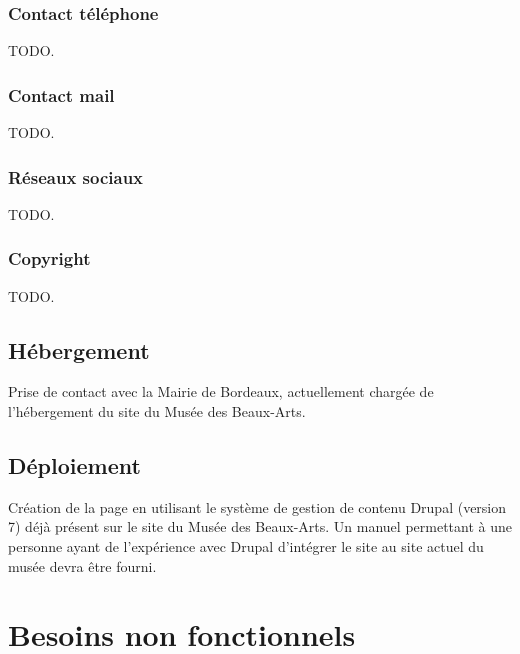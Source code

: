 \documentclass[11pt]{report}
\begin{document}
\subsubsection{Contact téléphone}

TODO.

\subsubsection{Contact mail}

TODO.

\subsubsection{Réseaux sociaux}

TODO.

\subsubsection{Copyright}

TODO.


\subsection*{Hébergement}
Prise de contact avec la Mairie de Bordeaux, actuellement chargée de
l'hébergement du site du Musée des Beaux-Arts.

\subsection*{Déploiement}
Création de la page en utilisant le système de gestion de contenu Drupal
(version 7) déjà présent sur le site du Musée des Beaux-Arts.
Un manuel permettant à une personne ayant de l'expérience avec Drupal
d'intégrer le site au site actuel du musée devra être fourni.


\section{Besoins non fonctionnels}
\end{document}
